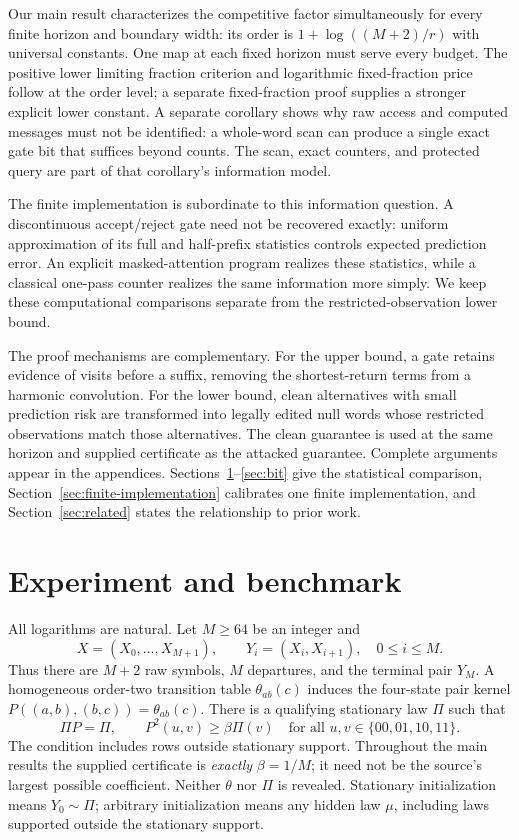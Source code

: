 \documentclass[11pt,letterpaper]{article}
\theoremstyle{definition}
\theoremstyle{remark}
\numberwithin{equation}{section}
\begin{document}
Our main result characterizes the competitive factor simultaneously for every finite horizon and boundary width: its order is $1+\log((M+2)/r)$ with universal constants. One map at each fixed horizon must serve every budget. The positive lower limiting fraction criterion and logarithmic fixed-fraction price follow at the order level; a separate fixed-fraction proof supplies a stronger explicit lower constant. A separate corollary shows why raw access and computed messages must not be identified: a whole-word scan can produce a single exact gate bit that suffices beyond counts. The scan, exact counters, and protected query are part of that corollary's information model.

The finite implementation is subordinate to this information question. A discontinuous accept/reject gate need not be recovered exactly: uniform approximation of its full and half-prefix statistics controls expected prediction error. An explicit masked-attention program realizes these statistics, while a classical one-pass counter realizes the same information more simply. We keep these computational comparisons separate from the restricted-observation lower bound.

The proof mechanisms are complementary. For the upper bound, a gate retains evidence of visits before a suffix, removing the shortest-return terms from a harmonic convolution. For the lower bound, clean alternatives with small prediction risk are transformed into legally edited null words whose restricted observations match those alternatives. The clean guarantee is used at the same horizon and supplied certificate as the attacked guarantee. Complete arguments appear in the appendices. Sections~\ref{sec:experiment}--\ref{sec:bit} give the statistical comparison, Section~\ref{sec:finite-implementation} calibrates one finite implementation, and Section~\ref{sec:related} states the relationship to prior work.

\section{Experiment and benchmark}\label{sec:experiment}
All logarithms are natural. Let $M\ge64$ be an integer and
\[
 X=(X_0,\ldots,X_{M+1}),\qquad Y_i=(X_i,X_{i+1}),\quad 0\le i\le M.
\]
Thus there are $M+2$ raw symbols, $M$ departures, and the terminal pair $Y_M$. A homogeneous order-two transition table $\theta_{ab}(c)$ induces the four-state pair kernel
$P((a,b),(b,c))=\theta_{ab}(c)$. There is a qualifying stationary law $\Pi$ such that
\begin{equation}\label{eq:certificate}
 \Pi P=\Pi,\qquad P^2(u,v)\ge\beta\Pi(v)\quad\text{for all }u,v\in\{00,01,10,11\}.
\end{equation}
The condition includes rows outside stationary support. Throughout the main results the supplied certificate is \emph{exactly} $\beta=1/M$; it need not be the source's largest possible coefficient. Neither $\theta$ nor $\Pi$ is revealed. Stationary initialization means $Y_0\sim\Pi$; arbitrary initialization means any hidden law $\mu$, including laws supported outside the stationary support.
\end{document}
